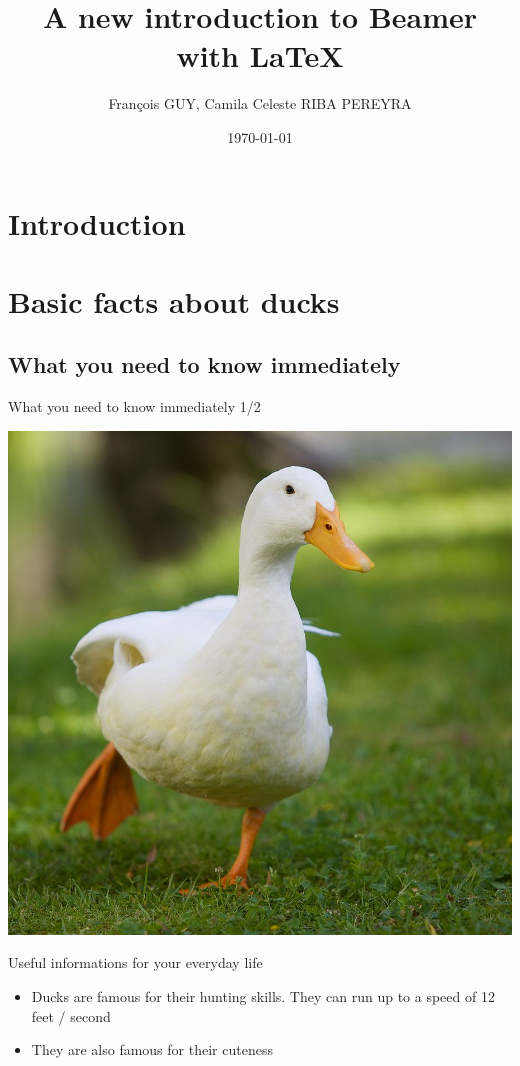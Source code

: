 \documentclass[11pt]{beamer}
\author{François GUY, Camila Celeste RIBA PEREYRA}
\title{A new introduction to Beamer with \LaTeX}
\institute{Université Savoie Mont Blanc, IS-Terre / IREGE}
\date{\today}
\begin{document}
\section{Introduction}
\begin{frame}[plain]
	\titlepage
\end{frame}

\begin{frame}
\tableofcontents
\end{frame}




\section{Basic facts about ducks}
\subsection{What you need to know immediately}
\begin{frame}{What you need to know immediately 1/2}
	\begin{center}
		\includegraphics[width = .4\textwidth]{runningduck.jpg}
	\end{center}
	\begin{block} {Useful informations for your everyday life}
		\begin{itemize}
			\pause
			\item Ducks are famous for their hunting skills. They can run up to a speed of 12 feet / second \cite{stewart1958locomotion}
			\pause
			\item They are also famous for their cuteness
		\end{itemize}
	\end{block}
\end{frame}
\end{document}
